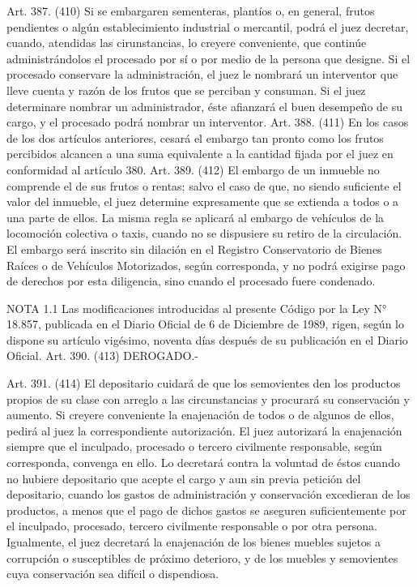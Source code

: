     Art. 387. (410) Si se embargaren sementeras, plantíos o, en general, frutos pendientes o algún establecimiento industrial o mercantil, podrá el juez decretar, cuando, atendidas las cirunstancias, lo creyere conveniente, que continúe administrándolos el procesado por sí o por medio de la persona que designe.
    Si el procesado conservare la administración, el juez le nombrará un interventor que lleve cuenta y razón de los frutos que se perciban y consuman. Si el juez determinare nombrar un administrador, éste afianzará el buen desempeño de su cargo, y el procesado podrá nombrar un interventor.
    Art. 388. (411) En los casos de los dos artículos anteriores, cesará el embargo tan pronto como los frutos percibidos alcancen a una suma equivalente a la cantidad fijada por el juez en conformidad al artículo 380.
    Art. 389. (412) El embargo de un inmueble no comprende el de sus frutos o rentas; salvo el caso de que, no siendo suficiente el valor del inmueble, el juez determine expresamente que se extienda a todos o a una parte de ellos.
    La misma regla se aplicará al embargo de vehículos de la locomoción colectiva o taxis, cuando no se dispusiere su retiro de la circulación.
    El embargo será inscrito sin dilación en el Registro Conservatorio de Bienes Raíces o de Vehículos Motorizados, según corresponda, y no podrá exigirse pago de derechos por esta diligencia, sino cuando el procesado fuere condenado.



NOTA 1.1
      Las modificaciones introducidas al presente Código por la Ley N° 18.857, publicada en el Diario Oficial de 6 de Diciembre de 1989, rigen, según lo dispone su artículo vigésimo, noventa días después de su publicación en el Diario Oficial.
    Art. 390. (413) DEROGADO.-


    Art. 391. (414) El depositario cuidará de que los semovientes den los productos propios de su clase con arreglo a las circunstancias y procurará su conservación y aumento.
    Si creyere conveniente la enajenación de todos o de algunos de ellos, pedirá al juez la correspondiente autorización.
    El juez autorizará la enajenación siempre que el inculpado, procesado o tercero civilmente responsable, según corresponda, convenga en ello. Lo decretará contra la voluntad de éstos cuando no hubiere depositario que acepte el cargo y aun sin previa petición del depositario, cuando los gastos de administración y conservación excedieran de los productos, a menos que el pago de dichos gastos se aseguren suficientemente por el inculpado, procesado, tercero civilmente responsable o por otra persona.
    Igualmente, el juez decretará la enajenación de los bienes muebles sujetos a corrupción o susceptibles de próximo deterioro, y de los muebles y semovientes cuya conservación sea difícil o dispendiosa.



